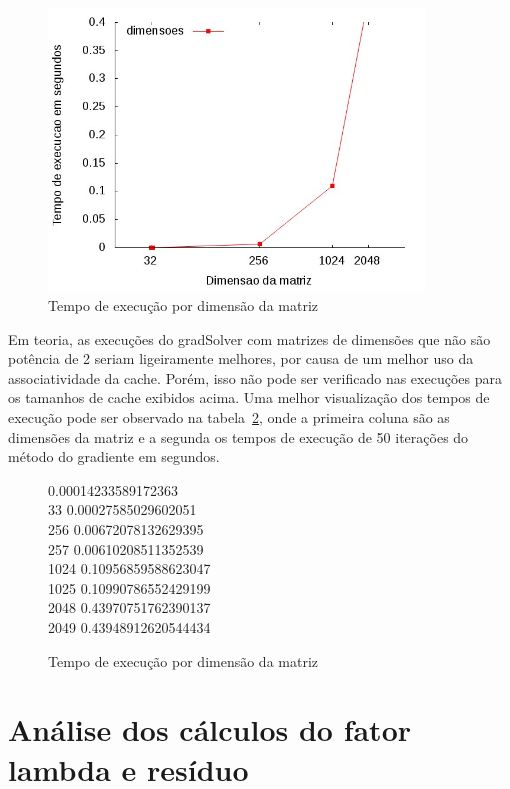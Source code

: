 \documentclass[12pt]{article}
\begin{document}
\begin{figure}[htb] \begin{center}
\includegraphics[width=100mm]{img/execucoes.jpg} \end{center}
\caption{Tempo de execução por dimensão da matriz}\label{fig:execucao}
\end{figure}

Em teoria, as execuções do gradSolver com matrizes de dimensões que não são
potência de 2 seriam ligeiramente melhores, por causa de um melhor uso da
associatividade da cache. Porém, isso não pode ser verificado nas execuções para
os tamanhos de cache exibidos acima. Uma melhor visualização dos tempos de
execução pode ser observado na tabela~\ref{fig:tabelaExecucoes}, onde a primeira
coluna são as dimensões da matriz e a segunda os tempos de execução de 50
iterações do método do gradiente em segundos.

\begin{figure}[htb]
\begin{tt}      0.00014233589172363\\
    33      0.00027585029602051\\
    256     0.00672078132629395\\
    257     0.00610208511352539\\
    1024    0.10956859588623047\\
    1025    0.10990786552429199\\
    2048    0.43970751762390137\\
    2049    0.43948912620544434\\
\end{tt}\caption{Tempo de execução por dimensão da matriz}\label{fig:tabelaExecucoes}
\end{figure}

\section{Análise dos cálculos do fator lambda e resíduo}\label{sec:lambdaResiduo}
\end{document}
